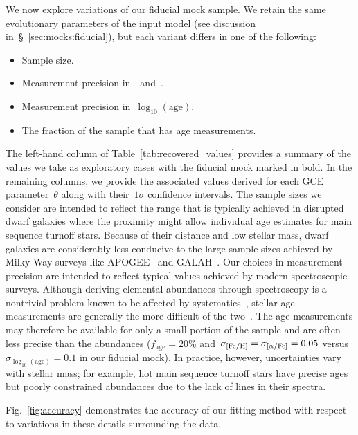 \documentclass[foo.tex]{subfiles}
\begin{document}
We now explore variations of our fiducial mock sample.
We retain the same evolutionary parameters of the input model (see discussion
in~\S~\ref{sec:mocks:fiducial}), but each variant differs in one of the
following:
\begin{itemize}

	\item Sample size.

	\item Measurement precision in~\feh~and~\afe.

	\item Measurement precision in~$\log_{10}(\text{age})$.

	\item The fraction of the sample that has age measurements.

\end{itemize}
The left-hand column of Table~\ref{tab:recovered_values} provides a summary of
the values we take as exploratory cases with the fiducial mock marked in bold.
In the remaining columns, we provide the associated values derived for each
GCE parameter~$\theta$ along with their~$1\sigma$ confidence intervals.
The sample sizes we consider are intended to reflect the range that is
typically achieved in disrupted dwarf galaxies where the proximity might
allow individual age estimates for main sequence turnoff stars.
Because of their distance and low stellar mass, dwarf galaxies are considerably
less conducive to the large sample sizes achieved by Milky Way surveys like
APOGEE~\citep{Majewski2017} and GALAH~\citep{DeSilva2015, Martell2017}.
Our choices in measurement precision are intended to reflect typical values
achieved by modern spectroscopic surveys.
Although deriving elemental abundances through spectroscopy is a nontrivial
problem known to be affected by systematics~\citep[e.g.,][]{Anguino2018},
stellar age measurements
are generally the more difficult of the two~\citep{Soderblom2010, Chaplin2013}.
The age measurements may therefore be available for only a small portion of the
sample and are often less precise than the abundances ($f_\text{age} = 20$\%
and~$\sigma_{\text{[Fe/H]}} = \sigma_{\text{[$\alpha$/Fe]}} = 0.05$ versus
$\sigma_{\log_{10}(\text{age})} = 0.1$ in our fiducial mock).
In practice, however, uncertainties vary with stellar mass; for example, hot
main sequence turnoff stars have precise ages but poorly constrained
abundances due to the lack of lines in their spectra.
\par
Fig.~\ref{fig:accuracy} demonstrates the accuracy of our fitting method with
respect to variations in these details surrounding the data.
\end{document}

